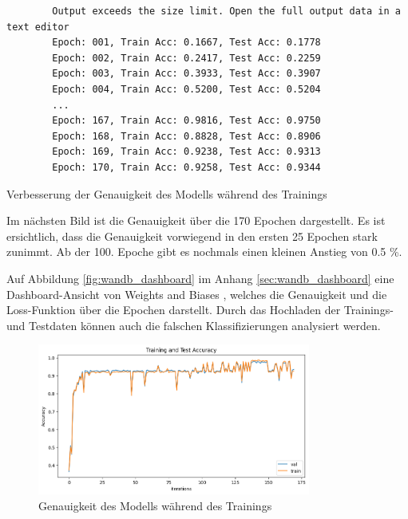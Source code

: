 \begin{listing}[H]
    \begin{verbatim}
        Output exceeds the size limit. Open the full output data in a text editor
        Epoch: 001, Train Acc: 0.1667, Test Acc: 0.1778
        Epoch: 002, Train Acc: 0.2417, Test Acc: 0.2259
        Epoch: 003, Train Acc: 0.3933, Test Acc: 0.3907
        Epoch: 004, Train Acc: 0.5200, Test Acc: 0.5204
        ...
        Epoch: 167, Train Acc: 0.9816, Test Acc: 0.9750
        Epoch: 168, Train Acc: 0.8828, Test Acc: 0.8906
        Epoch: 169, Train Acc: 0.9238, Test Acc: 0.9313
        Epoch: 170, Train Acc: 0.9258, Test Acc: 0.9344
    \end{verbatim}
    \caption{Verbesserung der Genauigkeit des Modells während des Trainings}
\end{listing}

Im nächsten Bild ist die Genauigkeit über die 170 Epochen dargestellt.
Es ist ersichtlich, dass die Genauigkeit vorwiegend in den ersten 25 Epochen stark zunimmt.
Ab der 100. Epoche gibt es nochmals einen kleinen Anstieg von 0.5 \%.

Auf Abbildung \ref{fig:wandb_dashboard} im Anhang \ref{sec:wandb_dashboard} eine Dashboard-Ansicht von Weights and Biases \cite{wandb}, welches die Genauigkeit und die Loss-Funktion über die Epochen darstellt.
Durch das Hochladen der Trainings- und Testdaten können auch die falschen Klassifizierungen analysiert werden.

\begin{figure}[H]
    \centering
    \includegraphics[width=0.8\textwidth]{images/30_results/train_test_acc.png}
    \caption{Genauigkeit des Modells während des Trainings}
    \label{fig:accuracy}
\end{figure}

